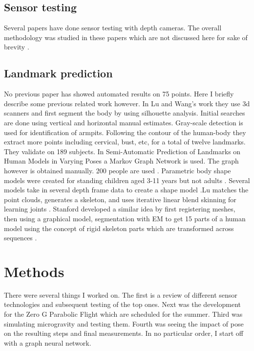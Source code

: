 \section{Sensor testing}
Several papers have done sensor testing with depth cameras. The overall methodology was studied in these papers which are not discussed here for sake of brevity\cite{sophian2017evaluation} \cite{khoshelham2012accuracy} \cite{langmann2012depth} \cite{sankowski2017estimation}.


\section{Landmark prediction}
No previous paper has showed automated results on 75 points. Here I briefly describe some previous related work however. In Lu and Wang's work \cite{lu2008automated} they use 3d scanners and first segment the body by using silhouette analysis. Initial searches are done using vertical and horizontal manual estimates. Gray-scale detection is used for identification of armpits. Following the contour of the human-body they extract more points including cervical, bust, etc, for a total of twelve landmarks. They validate on 189 subjects. In Semi-Automatic Prediction of Landmarks on Human Models in Varying Poses a Markov Graph Network is used. The graph however is obtained manually. 200 people are used \cite{wuhrer2010semi}. Parametric body shape models were created for standing children aged 3-11 years but not adults \cite{park2015parametric}. Several models take in several depth frame data to create a shape model \cite{deng2019neural}.Lu matches the point clouds, generates a skeleton, and uses iterative linear blend skinning for learning joints \cite{lu20193d}. Stanford developed a similar idea by first registering meshes, then using a graphical model, segmentation with EM to get 15 parts of a human model using the concept of rigid skeleton parts which are transformed across sequences \cite{anguelov2012recovering}.


\chapter{Methods}
There were several things I worked on. The first is a review of different sensor technologies and subsequent testing of the top ones. Next was the development for the Zero G Parabolic Flight which are scheduled for the summer. Third was simulating microgravity and testing them. Fourth was seeing the impact of pose on the resulting steps and final measurements. In no particular order, I start off with a graph neural network.

